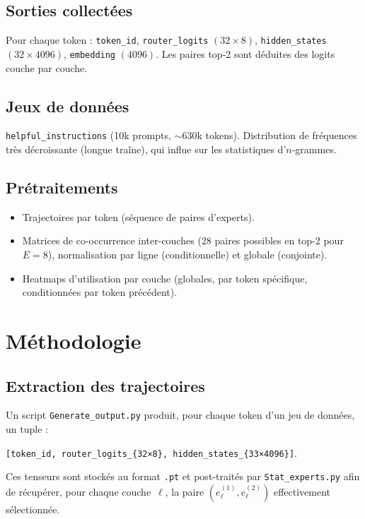 \documentclass{article}
\begin{document}
\subsection{Sorties collectées}
Pour chaque token : \texttt{token\_id}, \texttt{router\_logits} $(32\times 8)$, \texttt{hidden\_states} $(32\times 4096)$, \texttt{embedding} $(4096)$. Les paires top-2 sont déduites des logits couche par couche.

\subsection{Jeux de données}
\texttt{helpful\_instructions} (10k prompts, $\sim$630k tokens). Distribution de fréquences très décroissante (longue traîne), qui influe sur les statistiques d’$n$-grammes.

\subsection{Prétraitements}
\begin{itemize}
  \item Trajectoires par token (séquence de paires d’experts).
  \item Matrices de co-occurrence inter-couches (28 paires possibles en top-2 pour $E=8$), normalisation par ligne (conditionnelle) et globale (conjointe).
  \item Heatmaps d’utilisation par couche (globales, par token spécifique, conditionnées par token précédent).
\end{itemize}

\section{Méthodologie}

\subsection{Extraction des trajectoires}
Un script \texttt{Generate\_output.py} produit, pour chaque token d'un jeu de données, un tuple :
\begin{center}
\verb|[token_id, router_logits_{32×8}, hidden_states_{33×4096}]|.
\end{center}
Ces tenseurs sont stockés au format \texttt{.pt} et post-traités par \texttt{Stat\_experts.py} afin de récupérer, pour chaque couche~$\ell$, la paire $(e^{(1)}_{\ell}, e^{(2)}_{\ell})$ effectivement sélectionnée.
\end{document}
